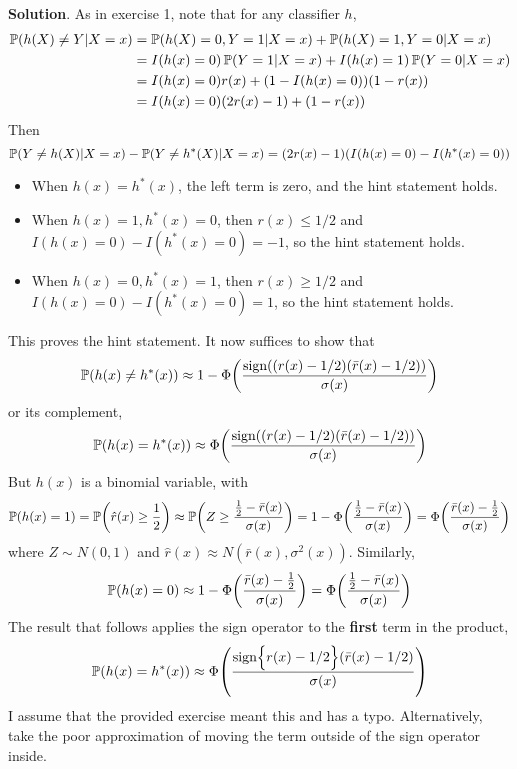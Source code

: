\textbf{Solution}.
As in exercise 1, note that for any classifier \(h\),
\begin{align*}
\operatorname{\mathbb{P}}(h(X) \neq Y | X = x) &= \operatorname{\mathbb{P}}(h(X) = 0, Y = 1 | X = x) + \operatorname{\mathbb{P}}(h(X) = 1, Y = 0 | X = x) \\
&= I(h(x) = 0) \operatorname{\mathbb{P}}(Y = 1 | X = x) + I(h(x) = 1) \operatorname{\mathbb{P}}(Y = 0 | X = x) \\
&= I(h(x) = 0) r(x) + (1 - I(h(x) = 0)) (1 - r(x)) \\
&= I(h(x) = 0) (2 r(x) - 1) + (1 - r(x))
\end{align*}
Then
\[
\PROB(Y \neq h(X) | X = x) - \PROB(Y \neq h^{*}(X) | X = x) = (2 r(x) - 1) \left(I(h(x) = 0) - I(h^{*}(x) = 0)\right)
\]
\begin{itemize}[tightlist]
\item
  When \(h(x) = h^{*}(x)\), the left term is zero, and the hint statement
  holds.
\item
  When \(h(x) = 1, h^{*}(x) = 0\), then \(r(x) \leq 1/2\) and
  \(I(h(x) = 0) - I(h^{*}(x) = 0) = -1\), so the hint statement holds.
\item
  When \(h(x) = 0, h^{*}(x) = 1\), then \(r(x) \geq 1/2\) and
  \(I(h(x) = 0) - I(h^{*}(x) = 0) = 1\), so the hint statement holds.
\end{itemize}
This proves the hint statement.
It now suffices to show that
\[
\PROB(h(x) \neq h^{*}(x)) \approx 1 - \Phi \left( \frac{\text{sign} \left( (r(x) - 1/2) (\bar{r}(x) - 1/2) \right)}{\sigma(x)} \right)
\]
or its complement,
\[
\PROB(h(x) = h^{*}(x)) \approx \Phi \left( \frac{\text{sign} \left( (r(x) - 1/2) (\bar{r}(x) - 1/2) \right)}{\sigma(x)} \right)
\]
But \(h(x)\) is a binomial variable, with
\[
\PROB(h(x) = 1) = \PROB\left(\hat{r}(x) \geq \frac{1}{2} \right) \approx \PROB\left( Z \geq \frac{\frac{1}{2} - \bar{r}(x)}{\sigma(x)} \right) = 1 - \Phi\left( \frac{\frac{1}{2} - \bar{r}(x)}{\sigma(x)} \right) = \Phi\left( \frac{\bar{r}(x) - \frac{1}{2}}{\sigma(x)} \right)
\]
where \(Z \sim N(0, 1)\) and
\(\hat{r}(x) \approx N(\bar{r}(x), \sigma^{2}(x))\). Similarly,
\[
\PROB(h(x) = 0) \approx 1 - \Phi\left( \frac{\bar{r}(x) - \frac{1}{2}}{\sigma(x)} \right) = \Phi\left( \frac{\frac{1}{2} - \bar{r}(x)}{\sigma(x)} \right)
\]
The result that follows applies the sign operator to the \textbf{first}
term in the product,
\[
\PROB(h(x) = h^{*}(x)) \approx \Phi \left( \frac{\text{sign} \Big\{ r(x) - 1/2 \Big\} (\bar{r}(x) - 1/2) }{\sigma(x)} \right)
\]
I assume that the provided exercise meant this and has a typo.
Alternatively, take the poor approximation of moving the term outside of
the sign operator inside.

